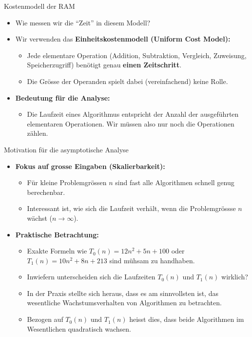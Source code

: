 \begin{frame}{Kostenmodell der RAM}
	\begin{itemize}[<+->]
		\item Wie messen wir die \enquote{Zeit} in diesem Modell?
		\item Wir verwenden das \textbf{Einheitskostenmodell (Uniform Cost Model):}
		\begin{itemize}
			\item Jede elementare Operation (Addition, Subtraktion, Vergleich, Zuweisung, Speicherzugriff) benötigt genau \textbf{einen Zeitschritt}.
			\item Die Grösse der Operanden spielt dabei (vereinfachend) keine Rolle.
		\end{itemize}
		\item \textbf{Bedeutung für die Analyse:}
		\begin{itemize}
			\item Die Laufzeit eines Algorithmus entspricht der Anzahl der ausgeführten elementaren Operationen. Wir müssen also nur noch die Operationen zählen.
		\end{itemize}
	\end{itemize}
\end{frame}

\begin{frame}{Motivation für die asymptotische Analyse}
	\begin{itemize}[<+->]
		\item \textbf{Fokus auf grosse Eingaben (Skalierbarkeit):}
		\begin{itemize}
			\item Für kleine Problemgrössen $n$ sind fast alle Algorithmen schnell genug berechenbar.
			\item Interessant ist, wie sich die Laufzeit verhält, wenn die Problemgrössse $n$ wächst ($n \to \infty$).
		\end{itemize}
		\item \textbf{Praktische Betrachtung:}
		\begin{itemize}
			\item Exakte Formeln wie $T_0(n) = 12n^2 + 5n + 100$ oder $T_1(n) = 10n^2 + 8n + 213$ sind mühsam zu handhaben.
			\item Inwiefern unterscheiden sich die Laufzeiten $T_0(n)$ und $T_1(n)$ wirklich?
			\item In der Praxis stellte sich heraus, dass es am sinnvollsten ist, das wesentliche Wachstumsverhalten von Algorithmen zu betrachten.
			\item Bezogen auf $T_0(n)$ und $T_1(n)$ heisst dies, dass beide Algorithmen im Wesentlichen quadratisch wachsen.
		\end{itemize}
	\end{itemize}
\end{frame}


